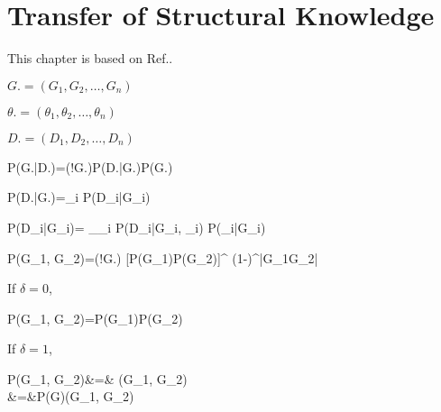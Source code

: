 \chapter{Transfer of Structural Knowledge}
\label{ch-transfer-struc}

This chapter is based on Ref.\cite{nic-transfer}.

$G. = (G_1, G_2, \ldots, G_n)$

$\theta. = (\theta_1, \theta_2, \ldots, \theta_n)$

$D. = (D_1, D_2, \ldots, D_n)$

\beq
P(G.|D.)=\caln(!G.)P(D.|G.)P(G.)
\eeq

\beq
P(D.|G.)=\prod_i P(D_i|G_i)
\eeq

\beq
P(D_i|G_i)=
\sum_{\theta_i}
P(D_i|G_i, \theta_i)
P(\theta_i|G_i)
\eeq

\beq
P(G_1, G_2)=\caln(!G.)
[P(G_1)P(G_2)]^{}
(1-\delta)^{|G_1\Delta G_2|}
\eeq


If $\delta=0$, 

\beq
P(G_1, G_2)=P(G_1)P(G_2)
\eeq

If $\delta=1$,

\beqa
P(G_1, G_2)&=&
\;\delta(G_1, G_2)
\\
&=&P(G)\;\delta(G_1, G_2)
\eeqa